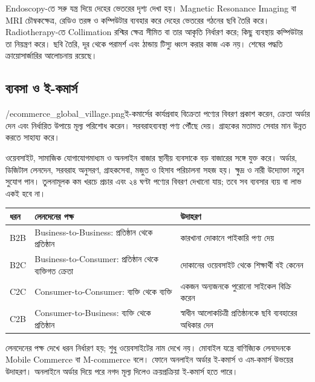 \begin{topicbody}
Endoscopy-তে সরু যন্ত্র দিয়ে দেহের ভেতরের দৃশ্য দেখা হয়। Magnetic Resonance Imaging বা MRI চৌম্বকক্ষেত্র, রেডিও তরঙ্গ ও কম্পিউটার ব্যবহার করে দেহের ভেতরের গঠনের ছবি তৈরি করে। Radiotherapy-তে Collimation রশ্মির ক্ষেত্র সীমিত বা তার আকৃতি নির্ধারণ করে; কিছু ব্যবস্থায় কম্পিউটার তা নিয়ন্ত্রণ করে। ছবি তৈরি, দূর থেকে পরামর্শ এবং ঠান্ডায় টিস্যু ধ্বংস করার কাজ এক নয়। শেষের পদ্ধতি ক্রায়োসার্জারির আলোচনায় রয়েছে।

\subsection{ব্যবসা ও ই-কমার্স}
\label{sec:ch1-ecommerce}
\begin{rightimageblock}{\chaponeimg/ecommerce_global_village.png}{ই-কমার্সের কার্যপ্রবাহ}
বিক্রেতা পণ্যের বিবরণ প্রকাশ করেন, ক্রেতা অর্ডার দেন এবং নির্ধারিত উপায়ে মূল্য পরিশোধ করেন। সরবরাহব্যবস্থা পণ্য পৌঁছে দেয়। গ্রাহকের মতামত সেবার মান উন্নত করতে সাহায্য করে।
\end{rightimageblock}\label{fig:ch1-pair-9}
ওয়েবসাইট, সামাজিক যোগাযোগমাধ্যম ও অনলাইন বাজার স্থানীয় ব্যবসাকে বড় বাজারের সঙ্গে যুক্ত করে। অর্ডার, ডিজিটাল লেনদেন, সরবরাহ অনুসরণ, গ্রাহকসেবা, মজুত ও হিসাব পরিচালনা সহজ হয়। ক্ষুদ্র ও নারী উদ্যোক্তা নতুন সুযোগ পান। তুলনামূলক কম খরচে প্রচার এবং ২৪ ঘণ্টা পণ্যের বিবরণ দেখানো যায়; তবে সব ব্যবসার ব্যয় বা লাভ একই হবে না।

\begin{compacttable}
\begin{tabular}{|p{}|p{}|p{}|}
\hline\textbf{ধরন} & \textbf{লেনদেনের পক্ষ} & \textbf{উদাহরণ}\\\hline
B2B & Business-to-Business: প্রতিষ্ঠান থেকে প্রতিষ্ঠান & কারখানা দোকানে পাইকারি পণ্য দেয়\\\hline
B2C & Business-to-Consumer: প্রতিষ্ঠান থেকে ব্যক্তিগত ক্রেতা & দোকানের ওয়েবসাইট থেকে শিক্ষার্থী বই কেনেন\\\hline
C2C & Consumer-to-Consumer: ব্যক্তি থেকে ব্যক্তি & একজন অন্যজনকে পুরোনো সাইকেল বিক্রি করেন\\\hline
C2B & Consumer-to-Business: ব্যক্তি থেকে প্রতিষ্ঠান & স্বাধীন আলোকচিত্রী প্রতিষ্ঠানকে ছবি ব্যবহারের অধিকার দেন\\\hline
\end{tabular}
\end{compacttable}
লেনদেনের পক্ষ দেখে ধরন নির্ধারণ হয়; শুধু ওয়েবসাইটের নাম দেখে নয়। মোবাইল যন্ত্রে বাণিজ্যিক লেনদেনকে Mobile Commerce বা M-commerce বলে। ফোনে অনলাইন অর্ডার ই-কমার্স ও এম-কমার্স উভয়ের উদাহরণ। অনলাইনে অর্ডার দিয়ে পরে নগদ মূল্য দিলেও ক্রয়প্রক্রিয়া ই-কমার্স হতে পারে।


\end{topicbody}
